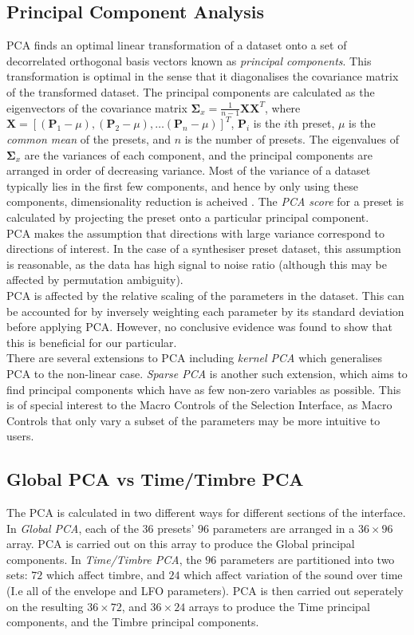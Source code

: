 \documentclass[11pt, oneside]{report}   	%
\renewcommand{\vec}[1]{\mathbf{#1}}
\begin{document}
\subsection{Principal Component Analysis}\label{sec:PCA}
\vspace{-5pt}
PCA finds an optimal linear transformation of a dataset onto a set of decorrelated orthogonal basis vectors known as \emph{principal components}. This transformation is optimal in the sense that it diagonalises the covariance matrix of the transformed dataset. 
The principal components are calculated as the eigenvectors of the covariance matrix $\vec{\Sigma}_x = \frac{1}{n-1}\vec{X}\vec{X}^T$, where $\vec{X} = [(\vec{P}_1-\mu), (\vec{P}_2-\mu), \dots (\vec{P}_n-\mu)]^T$, $\vec{P}_i$ is the $i$th preset, $\mu$ is the \emph{common mean} of the presets, and $n$ is the number of presets.
The eigenvalues of $\vec{\Sigma}_x$ are the variances of each component, and the principal components are arranged in order of decreasing variance.
Most of the variance of a dataset typically lies in the first few components, and hence by only using these components, dimensionality reduction is acheived \cite{PCA}. The \emph{PCA score} for a preset is calculated by projecting the preset onto a particular principal component.\\
PCA makes the assumption that directions with large variance correspond to directions of interest. In the case of a synthesiser preset dataset, this assumption is reasonable, as the data has high signal to noise ratio (although this may be affected by permutation ambiguity).\\
PCA is affected by the relative scaling of the parameters in the dataset. This can be accounted for by inversely weighting each parameter by its standard deviation before applying PCA. However, no conclusive evidence was found to show that this is beneficial for our particular.\\
There are several extensions to PCA including \emph{kernel PCA} which generalises PCA to the non-linear case. \emph{Sparse PCA} is another such extension, which aims to find principal components which have as few non-zero variables as possible. This is of special interest to the Macro Controls of the Selection Interface, as Macro Controls that only vary a subset of the parameters may be more intuitive to users.
\subsection{Global PCA vs Time/Timbre PCA}\label{sec:GlobalTimeTimbre}
The PCA is calculated in two different ways for different sections of the interface. In \emph{Global PCA}, each of the $36$ presets' $96$ parameters are arranged in a $36 \times 96$ array. PCA is carried out on this array to produce the Global principal components. 
%
In \emph{Time/Timbre PCA}, the $96$ parameters are partitioned into two sets: $72$ which affect timbre, and $24$ which affect variation of the sound over time (I.e all of the envelope and LFO parameters). PCA is then carried out seperately on the resulting  $36 \times 72$, and $36 \times 24$ arrays to produce the Time principal components, and the Timbre principal components. 
\end{document}
